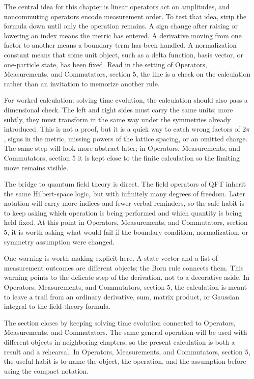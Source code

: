 The central idea for this chapter is linear operators act on amplitudes, and noncommuting operators encode measurement order.  To test that idea, strip the formula down until only the operation remains.  A sign change after raising or lowering an index means the metric has entered.  A derivative moving from one factor to another means a boundary term has been handled.  A normalization constant means that some unit object, such as a delta function, basis vector, or one-particle state, has been fixed.  Read in the setting of Operators, Measurements, and Commutators, section 5, the line is a check on the calculation rather than an invitation to memorize another rule.

For worked calculation: solving time evolution, the calculation should also pass a dimensional check.  The left and right sides must carry the same units; more subtly, they must transform in the same way under the symmetries already introduced.  This is not a proof, but it is a quick way to catch wrong factors of \(2\pi\), signs in the metric, missing powers of the lattice spacing, or an omitted charge.  The same step will look more abstract later; in Operators, Measurements, and Commutators, section 5 it is kept close to the finite calculation so the limiting move remains visible.

The bridge to quantum field theory is direct.  The field operators of QFT inherit the same Hilbert-space logic, but with infinitely many degrees of freedom.  Later notation will carry more indices and fewer verbal reminders, so the safe habit is to keep asking which operation is being performed and which quantity is being held fixed.  At this point in Operators, Measurements, and Commutators, section 5, it is worth asking what would fail if the boundary condition, normalization, or symmetry assumption were changed.

One warning is worth making explicit here.  A state vector and a list of measurement outcomes are different objects; the Born rule connects them.  This warning points to the delicate step of the derivation, not to a decorative aside.  In Operators, Measurements, and Commutators, section 5, the calculation is meant to leave a trail from an ordinary derivative, sum, matrix product, or Gaussian integral to the field-theory formula.

The section closes by keeping solving time evolution connected to Operators, Measurements, and Commutators.  The same general operation will be used with different objects in neighboring chapters, so the present calculation is both a result and a rehearsal.  In Operators, Measurements, and Commutators, section 5, the useful habit is to name the object, the operation, and the assumption before using the compact notation.




